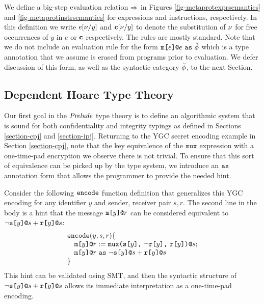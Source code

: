 \metaprotexprsemanticsfig

We define a big-step evaluation relation $\Rightarrow$ in Figures
\ref{fig-metaprotexprsemantics} and \ref{fig-metaprotinstrsemantics}
for expressions and instructions, respectively.  In this definition we
write $e[\nu/y]$ and $\mathbf{c}[\nu/y]$ to denote the substitution of
$\nu$ for free occurrences of $y$ in $e$ or $\mathbf{c}$ respectively. The
rules are mostly standard. Note that we do not include an evaluation
rule for the form $\texttt{m[}e\texttt{]}\texttt{@}e\ \texttt{as}\ \breve{\phi}$ which is a type
annotation that we assume is erased from programs prior to
evaluation. We defer discussion of this form, as well as the syntactic
category $\breve{\phi}$, to the next Section.

\metaprotinstrsemanticsfig

\subsection{Dependent Hoare Type Theory}
\label{section-metalangty}

Our first goal in the $\mathit{Prelude}$ type theory is to define an
algorithmic system that is sound for both confidentiality and
integrity typings as defined in Sections \ref{section-cpj} and
\ref{section-ipj}. Returning to the YGC secret encoding example in
Section \ref{section-cpj}, note that the key equivalence of the
$\texttt{mux}$ expression with a one-time-pad encryption we observe there
is not trivial. To ensure that this sort of equivalence can be picked
up by the type system, we introduce an $\texttt{as}$ annotation form that
allows the programmer to provide the needed hint.

Consider the following $\texttt{encode}$ function definition that
generalizes this YGC encoding for any identifier $y$ and sender, receiver
pair $s,r$. The second line in the body is a hint that
the message $\texttt{m[}y\texttt{]}\texttt{@}r$ can be considered equivalent to
$\neg\texttt{s[}y\texttt{]}\texttt{@}s + \texttt{r[}y\texttt{]}\texttt{@}s$:
$$
\begin{array}{l}
\texttt{encode}(y,s,r) \{\\
\quad \texttt{m[}y\texttt{]}\texttt{@}r := \texttt{mux(} \texttt{s[}y\texttt{]} \texttt{,}\ \neg\texttt{r[}y\texttt{]} \texttt{,}\ \texttt{r[}y\texttt{]} \texttt{)}\texttt{@}s;\\
\quad \texttt{m[}y\texttt{]}\texttt{@}r\ \texttt{as}\ \neg\texttt{s[}y\texttt{]}\texttt{@}s + \texttt{r[}y\texttt{]}\texttt{@}s\\
\}
\end{array}
$$
This hint can be validated using SMT, and then the
syntactic structure of $\neg\texttt{s[}y\texttt{]}\texttt{@}s + \texttt{r[}y\texttt{]}\texttt{@}s$
allows its immediate interpretation as a one-time-pad encoding.

